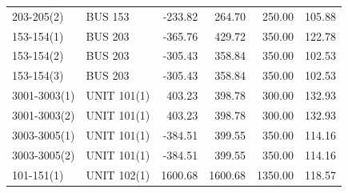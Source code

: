 \documentclass[10pt]{report}
\begin{document}
\begin{table}[H]
{\begin{tabular}{llrrrr}
203-205(2) & BUS 153 & -233.82 & 264.70 & 250.00 & 105.88 \\
153-154(1) & BUS 203 & -365.76 & 429.72 & 350.00 & 122.78 \\
153-154(2) & BUS 203 & -305.43 & 358.84 & 350.00 & 102.53 \\
153-154(3) & BUS 203 & -305.43 & 358.84 & 350.00 & 102.53 \\
3001-3003(1) & UNIT 101(1) & 403.23 & 398.78 & 300.00 & 132.93 \\
3001-3003(2) & UNIT 101(1) & 403.23 & 398.78 & 300.00 & 132.93 \\
3003-3005(1) & UNIT 101(1) & -384.51 & 399.55 & 350.00 & 114.16 \\
3003-3005(2) & UNIT 101(1) & -384.51 & 399.55 & 350.00 & 114.16 \\
101-151(1) & UNIT 102(1) & 1600.68 & 1600.68 & 1350.00 & 118.57 \\
\bottomrule
\end{tabular}}
\end{table}
\end{document}
